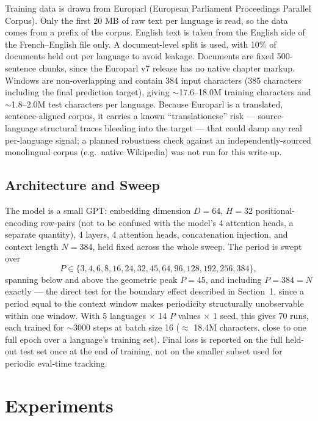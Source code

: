 \documentclass[11pt]{article}
\begin{document}
Training data is drawn from Europarl (European Parliament Proceedings Parallel Corpus). Only the first 20 MB of raw text per language is read, so the data comes from a prefix of the corpus. English text is taken from the English side of the French--English file only. A document-level split is used, with 10\% of documents held out per language to avoid leakage. Documents are fixed 500-sentence chunks, since the Europarl v7 release has no native chapter markup. Windows are non-overlapping and contain 384 input characters (385 characters including the final prediction target), giving $\sim$17.6--18.0M training characters and $\sim$1.8--2.0M test characters per language. Because Europarl is a translated, sentence-aligned corpus, it carries a known ``translationese'' risk --- source-language structural traces bleeding into the target --- that could damp any real per-language signal; a planned robustness check against an independently-sourced monolingual corpus (e.g.\ native Wikipedia) was not run for this write-up.

\subsection{Architecture and Sweep}

The model is a small GPT: embedding dimension $D = 64$, $H = 32$ positional-encoding row-pairs (not to be confused with the model's 4 attention heads, a separate quantity), 4 layers, 4 attention heads, concatenation injection, and context length $N = 384$, held fixed across the whole sweep. The period is swept over
\[
  P \in \{3, 4, 6, 8, 16, 24, 32, 45, 64, 96, 128, 192, 256, 384\},
\]
spanning below and above the geometric peak $P = 45$, and including $P = 384 = N$ exactly --- the direct test for the boundary effect described in Section~1, since a period equal to the context window makes periodicity structurally unobservable within one window. With 5 languages $\times$ 14 $P$ values $\times$ 1 seed, this gives 70 runs, each trained for $\sim$3000 steps at batch size 16 ($\approx$ 18.4M characters, close to one full epoch over a language's training set). Final loss is reported on the full held-out test set once at the end of training, not on the smaller subset used for periodic eval-time tracking.

\section{Experiments}
\label{sec:experiments}
\end{document}

